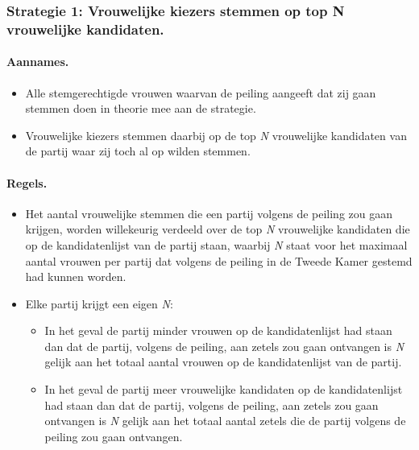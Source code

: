 \subsubsection*{Strategie 1: Vrouwelijke kiezers stemmen op top N vrouwelijke kandidaten.}

\paragraph{Aannames.}
\begin{itemize}
	\item
Alle stemgerechtigde vrouwen waarvan de peiling aangeeft dat zij gaan stemmen doen in theorie mee aan de strategie.
	\item
Vrouwelijke kiezers stemmen daarbij op de top \textit{N} vrouwelijke kandidaten van de partij waar zij toch al op wilden stemmen.
\end{itemize}

\paragraph{Regels.}
\begin{itemize}
	\item
Het aantal vrouwelijke stemmen die een partij volgens de peiling zou gaan krijgen, worden willekeurig verdeeld over de top \textit{N} vrouwelijke kandidaten die op de kandidatenlijst van de partij staan, waarbij \textit{N} staat voor het maximaal aantal vrouwen per partij dat volgens de peiling in de Tweede Kamer gestemd had kunnen worden.
 	\item
Elke partij krijgt een eigen \textit{N}:
	\begin{itemize}
		\item
In het geval de partij minder vrouwen op de kandidatenlijst had staan dan dat de partij, volgens de peiling, aan zetels zou gaan ontvangen is \textit{N} gelijk aan het totaal aantal vrouwen op de kandidatenlijst van de partij.
		\item
In het geval de partij meer vrouwelijke kandidaten op de kandidatenlijst had staan dan dat de partij, volgens de peiling, aan zetels zou gaan ontvangen is \textit{N} gelijk aan het totaal aantal zetels die de partij volgens de peiling zou gaan ontvangen.
\end{itemize} 	
\end{itemize}

